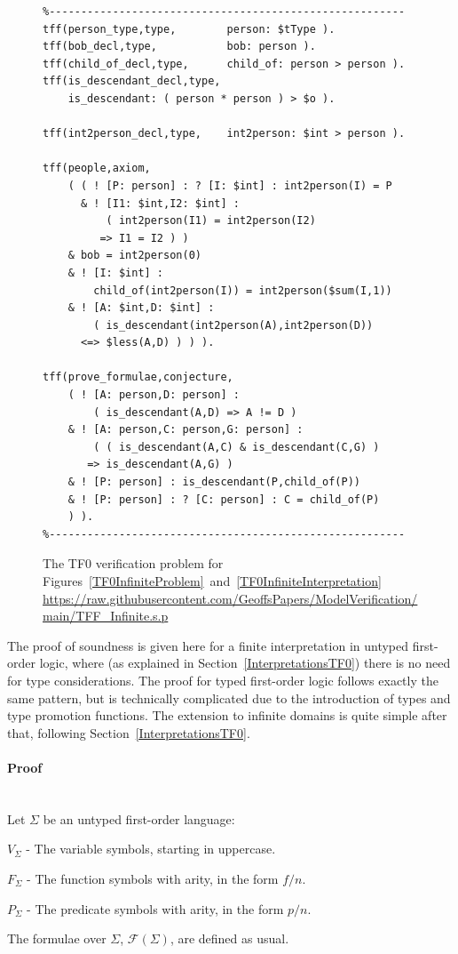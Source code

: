 \documentclass{easychair}
\newenvironment{packed_itemize}{
\vspace*{-0.2em}
\begin{itemize}
\setlength{\partopsep}{0pt}
\setlength{\itemsep}{1pt}
\setlength{\parskip}{0pt}
\setlength{\parsep}{0pt}
}{\end{itemize}}
\begin{document}
\begin{figure}[htbp]
\small
{}
\begin{verbatim}
%--------------------------------------------------------
tff(person_type,type,        person: $tType ).
tff(bob_decl,type,           bob: person ).
tff(child_of_decl,type,      child_of: person > person ).
tff(is_descendant_decl,type, 
    is_descendant: ( person * person ) > $o ).

tff(int2person_decl,type,    int2person: $int > person ).

tff(people,axiom,
    ( ( ! [P: person] : ? [I: $int] : int2person(I) = P
      & ! [I1: $int,I2: $int] : 
          ( int2person(I1) = int2person(I2) 
         => I1 = I2 ) )
    & bob = int2person(0)
    & ! [I: $int] : 
        child_of(int2person(I)) = int2person($sum(I,1))
    & ! [A: $int,D: $int] : 
        ( is_descendant(int2person(A),int2person(D)) 
      <=> $less(A,D) ) ) ).

tff(prove_formulae,conjecture,
    ( ! [A: person,D: person] : 
        ( is_descendant(A,D) => A != D )
    & ! [A: person,C: person,G: person] :
        ( ( is_descendant(A,C) & is_descendant(C,G) )
       => is_descendant(A,G) )
    & ! [P: person] : is_descendant(P,child_of(P))
    & ! [P: person] : ? [C: person] : C = child_of(P) 
    ) ).
%--------------------------------------------------------
\end{verbatim}
\caption{The TF0 verification problem for 
Figures~\ref{TF0InfiniteProblem}~and~\ref{TF0InfiniteInterpretation}\\
{\footnotesize \url{https://raw.githubusercontent.com/GeoffsPapers/ModelVerification/main/TFF_Infinite.s.p}}}
\label{TF0InfiniteVerification}
\end{figure}

The proof of soundness is given here for a finite interpretation in untyped first-order logic, 
where (as explained in Section~\ref{InterpretationsTF0}) there is no need for type considerations.
The proof for typed first-order logic follows exactly the same pattern, but is technically
complicated due to the introduction of types and type promotion functions.
The extension to infinite domains is quite simple after that, following 
Section~\ref{InterpretationsTF0}.

\newpage
\paragraph{Proof}
~\\
Let $\Sigma$ be an untyped first-order language:
\begin{packed_itemize}
\item $V_\Sigma$ - The variable symbols, starting in uppercase.
\item $F_\Sigma$ - The function symbols with arity, in the form $f/n$.
\item $P_\Sigma$ - The predicate symbols with arity, in the form $p/n$.
\end{packed_itemize}
The formulae over $\Sigma$, $\mathcal{F}(\Sigma)$, are defined as usual. 
\end{document}
